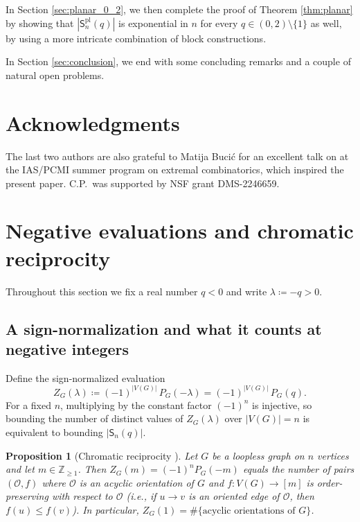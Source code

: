 \documentclass[A4paper,reqno,oneside,12pt]{amsart}
\theoremstyle{plain}
\newtheorem{proposition}[theorem]{Proposition}
\theoremstyle{definition}
\begin{document}
In Section \ref{sec:planar_0_2}, we then complete the proof of Theorem \ref{thm:planar} by showing that $|\mathsf{S}^{\mathrm{pl}}_n(q)|$ is exponential in $n$ for every $q\in(0,2)\setminus\{1\}$ as well, by using a more intricate combination of block constructions. 

In Section \ref{sec:conclusion}, we end with some concluding remarks and a couple of natural open problems. 

\section*{Acknowledgments}
The last two authors are also grateful to Matija Buci\'c for an excellent talk on \cite{ABG} at the IAS/PCMI summer program on extremal combinatorics, which inspired the present paper. C.P.\ was supported by NSF grant DMS-2246659.



\section{Negative evaluations and chromatic reciprocity}\label{sec:negative}

Throughout this section we fix a real number $q<0$ and write $\lambda\coloneqq-q>0$. 

\subsection{A sign-normalization and what it counts at negative integers}

Define the sign-normalized evaluation
\begin{equation}\label{eq:Zdef}
Z_G(\lambda)\coloneqq(-1)^{|V(G)|}\,P_G(-\lambda)=(-1)^{|V(G)|}\,P_G(q).
\end{equation}
For a fixed $n$, multiplying by the constant factor $(-1)^n$ is injective, so bounding the number of distinct values of $Z_G(\lambda)$ over $|V(G)|=n$
is equivalent to bounding $|\mathsf{S}_n(q)|$.

\begin{proposition}[Chromatic reciprocity {\cite[Thm.\ 1.2]{Stanley1973}}]\label{prop:chromrecip}
Let $G$ be a loopless graph on $n$ vertices and let $m\in\mathbb{Z}_{\ge 1}$.
Then $Z_G(m)=(-1)^nP_G(-m)$ equals the number of pairs $(\mathcal{O},f)$ where
$\mathcal{O}$ is an acyclic orientation of $G$ and $f:V(G)\to[m]$ is order-preserving with respect to $\mathcal{O}$ (i.e., if $u\to v$ is an oriented edge of $\mathcal{O}$, then $f(u)\le f(v)$).
In particular, $Z_G(1)=\#\{\text{acyclic orientations of }G\}$.
\end{proposition}
\end{document}
